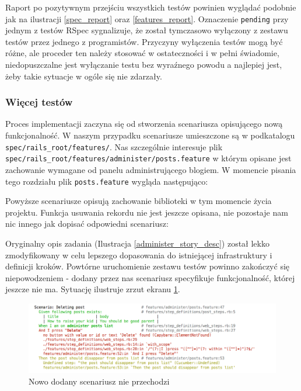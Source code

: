   	  Raport po pozytywnym przejściu wszystkich testów powinien wyglądać podobnie jak na ilustracji \ref{spec_report} oraz \ref{features_report}. Oznaczenie \texttt{pending} przy jednym z testów RSpec sygnalizuje, że został tymczasowo wyłączony z zestawu testów przez jednego z programistów. Przyczyny wyłączenia testów mogą być różne, ale proceder ten należy stosować w ostateczności i w pełni świadomie, niedopuszczalne jest wyłączanie testu bez wyraźnego powodu a najlepiej jest, żeby takie sytuacje w ogóle się nie zdarzały.
  	  
  	\subsubsection{Więcej testów}
  	  Proces implementacji zaczyna się od stworzenia scenariusza opisującego nową funkcjonalność. W naszym przypadku scenariusze umieszczone są w podkatalogu \texttt{spec/rails\_root/features/}. Nas szczególnie interesuje plik \texttt{spec/rails\_root/features/administer/posts.feature} w którym opisane jest zachowanie wymagane od panelu administrującego blogiem. W momencie pisania tego rozdziału plik \texttt{posts.feature} wygląda następująco:
  	  
  	
  	
  	Powyższe scenariusze opisują zachowanie biblioteki w tym momencie życia projektu. Funkcja usuwania rekordu nie jest jeszcze opisana, nie pozostaje nam nic innego jak dopisać odpowiedni scenariusz:
  	
  	
  	
  	Oryginalny opis zadania (Ilustracja \ref{administer_story_desc}) został lekko zmodyfikowany w celu lepszego dopasowania do istniejącej infrastruktury i definicji kroków. Powtórne uruchomienie zestawu testów powinno zakończyć się niepowodzeniem - dodany przez nas scenariusz specyfikuje funkcjonalność, której jeszcze nie ma. Sytuację ilustruje zrzut ekranu \ref{scenario_failure}.
  	
  	\clearpage
  	
  	\begin{figure}[!h]
  		\begin{center}
  			\includegraphics[width=\linewidth]{images/scenario_failure.png}
  			\caption{Nowo dodany scenariusz nie przechodzi}
  			\label{scenario_failure}
  		\end{center}
  	\end{figure}
  	
